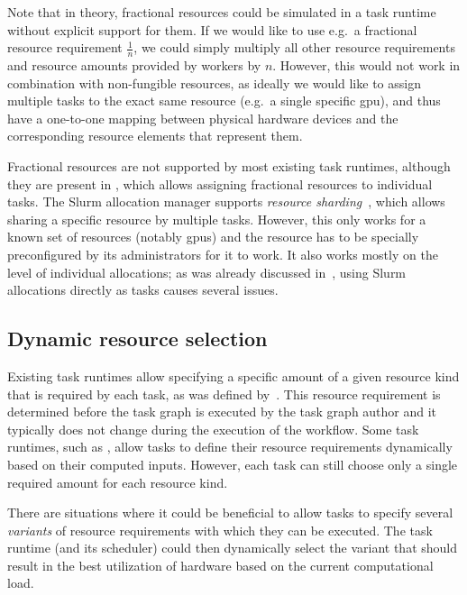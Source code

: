 Note that in theory, fractional resources could be simulated in a task runtime without explicit
support for them. If we would like to use e.g.\ a fractional resource requirement
$\frac{1}{n}$, we could simply multiply all other resource requirements and resource
amounts provided by workers by $n$. However, this would not work in combination
with non-fungible resources, as ideally we would like to assign multiple tasks to the exact same
resource (e.g.\ a single specific \gls{gpu}), and thus have a one-to-one mapping
between physical hardware devices and the corresponding resource elements that represent them.

Fractional resources are not supported by most existing task runtimes, although they are present in
\ray{}, which allows assigning fractional resources to individual tasks. The Slurm
allocation manager supports \emph{resource sharding}~\cite{slurm-sharding}, which allows sharing a
specific resource by multiple tasks. However, this only works for a known set of resources (notably
\glspl{gpu}) and the resource has to be specially preconfigured by its administrators
for it to work. It also works mostly on the level of individual allocations; as was already
discussed in~, using Slurm allocations directly as tasks causes several
issues.

\subsection{Dynamic resource selection}
\label{sec:dynamic-resource-selection}
Existing task runtimes allow specifying a specific amount of a given resource kind that is required
by each task, as was defined by~. This resource requirement is determined
before the task graph is executed by the task graph author and it typically does not change during
the execution of the workflow. Some task runtimes, such as \snakemake{}, allow tasks to
define their resource requirements dynamically based on their computed inputs. However, each task
can still choose only a single required amount for each resource kind.

There are situations where it could be beneficial to allow tasks to specify several
\emph{variants} of resource requirements with which they can be executed. The task runtime
(and its scheduler) could then dynamically select the variant that should result in the best
utilization of hardware based on the current computational load.

